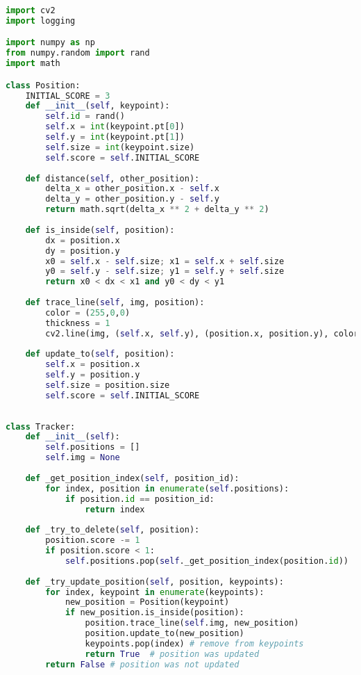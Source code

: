 \documentclass[hidelinks,11pt,a4paper,oneside,article]{memoir}
\begin{document}
\begin{lstlisting}[label={listing:tracking},caption={Implementation of the tracking algorithm},language=Python, style=styleprogramming]
import cv2
import logging

import numpy as np
from numpy.random import rand
import math

class Position:
    INITIAL_SCORE = 3
    def __init__(self, keypoint):
        self.id = rand()
        self.x = int(keypoint.pt[0])
        self.y = int(keypoint.pt[1])
        self.size = int(keypoint.size)
        self.score = self.INITIAL_SCORE
    
    def distance(self, other_position):
        delta_x = other_position.x - self.x
        delta_y = other_position.y - self.y
        return math.sqrt(delta_x ** 2 + delta_y ** 2)
    
    def is_inside(self, position):
        dx = position.x
        dy = position.y
        x0 = self.x - self.size; x1 = self.x + self.size
        y0 = self.y - self.size; y1 = self.y + self.size
        return x0 < dx < x1 and y0 < dy < y1
    
    def trace_line(self, img, position):
        color = (255,0,0)
        thickness = 1
        cv2.line(img, (self.x, self.y), (position.x, position.y), color, thickness)
    
    def update_to(self, position):
        self.x = position.x
        self.y = position.y
        self.size = position.size
        self.score = self.INITIAL_SCORE
    
    
class Tracker:
    def __init__(self):
        self.positions = []
        self.img = None
    
    def _get_position_index(self, position_id):
        for index, position in enumerate(self.positions):
            if position.id == position_id:
                return index
    
    def _try_to_delete(self, position):
        position.score -= 1
        if position.score < 1:
            self.positions.pop(self._get_position_index(position.id))
    
    def _try_update_position(self, position, keypoints):
        for index, keypoint in enumerate(keypoints):
            new_position = Position(keypoint)
            if new_position.is_inside(position):
                position.trace_line(self.img, new_position)
                position.update_to(new_position)
                keypoints.pop(index) # remove from keypoints
                return True  # position was updated
        return False # position was not updated
    

\end{lstlisting}
\end{document}
